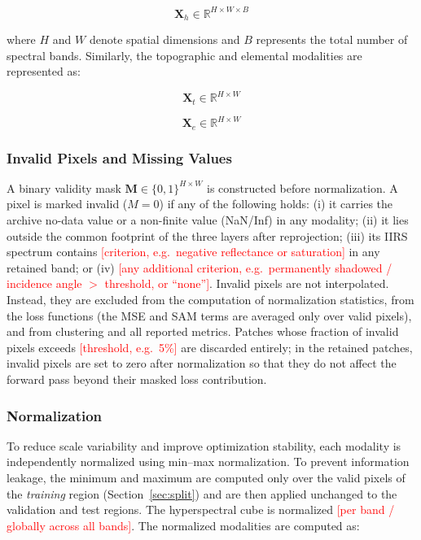 \documentclass[pdflatex,sn-mathphys-num]{sn-jnl}
\newcommand{\fillin}[1]{\textcolor{red}{[#1]}}
\begin{document}
\[
\mathbf{X}_{h} \in \mathbb{R}^{H \times W \times B}
\]

where \(H\) and \(W\) denote spatial dimensions and \(B\) represents the total number of spectral bands. Similarly, the topographic and elemental modalities are represented as:

\[
\mathbf{X}_{t} \in \mathbb{R}^{H \times W}
\]

\[
\mathbf{X}_{e} \in \mathbb{R}^{H \times W}
\]

\subsubsection{Invalid Pixels and Missing Values}
\label{sec:invalid}

A binary validity mask $\mathbf{M}\in\{0,1\}^{H\times W}$ is constructed before normalization. A pixel is marked invalid ($M=0$) if any of the following holds: (i) it carries the archive no-data value or a non-finite value (NaN/Inf) in any modality; (ii) it lies outside the common footprint of the three layers after reprojection; (iii) its IIRS spectrum contains \fillin{criterion, e.g.\ negative reflectance or saturation} in any retained band; or (iv) \fillin{any additional criterion, e.g.\ permanently shadowed / incidence angle $>$ threshold, or ``none''}. Invalid pixels are not interpolated. Instead, they are excluded from the computation of normalization statistics, from the loss functions (the MSE and SAM terms are averaged only over valid pixels), and from clustering and all reported metrics. Patches whose fraction of invalid pixels exceeds \fillin{threshold, e.g.\ 5\%} are discarded entirely; in the retained patches, invalid pixels are set to zero after normalization so that they do not affect the forward pass beyond their masked loss contribution.

\subsubsection{Normalization}
\label{sec:normalization}

To reduce scale variability and improve optimization stability, each modality is independently normalized using min--max normalization. To prevent information leakage, the minimum and maximum are computed only over the valid pixels of the \emph{training} region (Section~\ref{sec:split}) and are then applied unchanged to the validation and test regions. The hyperspectral cube is normalized \fillin{per band / globally across all bands}. The normalized modalities are computed as:
\end{document}
